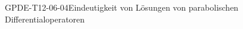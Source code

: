
\begin{KORO}{GPDE-T12-06-04}{Eindeutigkeit von Lösungen von parabolischen Differentialoperatoren}
\end{KORO}
